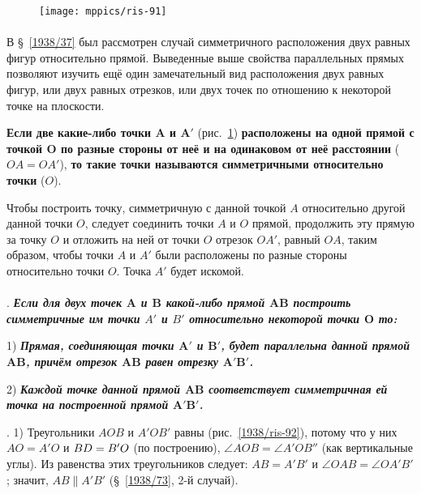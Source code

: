 \documentclass[oneside]{book}
\begin{document}
\begin{figure}
\vskip-5mm
\centering
\texttt{[image: mppics/ris-91]}
\caption{}\label{1938/ris-91}
\end{figure}

\paragraph{}\label{1938/84}
В §~\ref{1938/37} был рассмотрен случай симметричного расположения двух равных фигур относительно прямой.
Выведенные выше свойства параллельных прямых позволяют изучить ещё один замечательный вид расположения двух равных фигур, или двух равных отрезков, или двух точек по отношению к некоторой точке на плоскости.

\textbf{Если две какие-либо точки $\bm{A}$ и $\bm{A'}$} (рис.~\ref{1938/ris-91}) \textbf{расположены на одной прямой с точкой $\bm{O}$ по разные стороны от неё и на одинаковом от неё расстоянии} ($OA=OA'$), \textbf{то такие точки называются симметричными относительно точки} ($O$).

Чтобы построить точку, симметричную с данной точкой $A$ относительно другой данной точки $O$, следует соединить точки $A$ и $O$ прямой, продолжить эту прямую за точку $O$ и отложить на ней от точки $O$ отрезок $OA'$, равный $OA$, таким образом, чтобы точки $A$ и $A'$ были расположены по разные стороны относительно точки $O$.
Точка $A'$ будет искомой.

\paragraph{}\label{1938/85}
.
\textbf{\emph{Если для двух точек $\bm{A}$ и $\bm{B}$ какой-либо прямой $\bm{AB}$ построить симметричные им точки $A'$ и $B'$ относительно некоторой точки $\bm{O}$ то:}}

1) \textbf{\emph{Прямая, соединяющая точки $\bm{A'}$ и $\bm{B'}$, будет параллельна данной прямой $\bm{AB}$, причём отрезок $\bm{AB}$ равен отрезку $\bm{A'B'}$.}}

2) \textbf{\emph{Каждой точке данной прямой $\bm{AB}$ соответствует симметричная ей точка на построенной прямой $\bm{A'B'}$.}}

\smallskip
\mbox{.}
1) Треугольники $AOB$ и $A'OB'$ равны (рис.~\ref{1938/ris-92}), потому что у них $AO=A'O$ и $BD\z=B'O$ (по построению), $\angle AOB=\angle A'OB''$ (как вертикальные углы).
Из равенства этих треугольников следует:
$AB=A'B'$ и $\angle OAB = \angle OA'B'$;
значит, $AB\parallel A'B'$ (§~\ref{1938/73}, 2-й случай).
\end{document}
